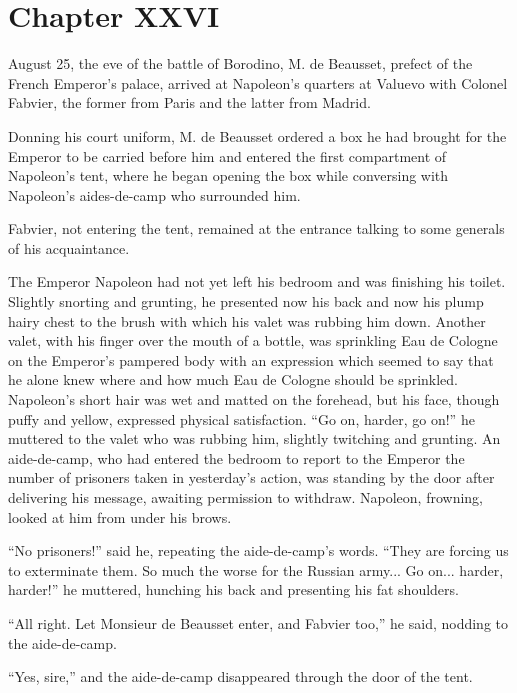 \chapter*{Chapter XXVI} \ifaudio {}
\fi

 August 25, the eve of the battle of Borodino, M. de Beausset,
prefect of the French Emperor's palace, arrived at Napoleon's
quarters at Valuevo with Colonel Fabvier, the former from Paris
and the latter from Madrid.

Donning his court uniform, M. de Beausset ordered a box he had
brought for the Emperor to be carried before him and entered the
first compartment of Napoleon's tent, where he began opening the
box while conversing with Napoleon's aides-de-camp who surrounded
him.

Fabvier, not entering the tent, remained at the entrance talking
to some generals of his acquaintance.

The Emperor Napoleon had not yet left his bedroom and was
finishing his toilet. Slightly snorting and grunting, he
presented now his back and now his plump hairy chest to the brush
with which his valet was rubbing him down. Another valet, with
his finger over the mouth of a bottle, was sprinkling Eau de
Cologne on the Emperor's pampered body with an expression which
seemed to say that he alone knew where and how much Eau de
Cologne should be sprinkled. Napoleon's short hair was wet and
matted on the forehead, but his face, though puffy and yellow,
expressed physical satisfaction. ``Go on, harder, go on!'' he
muttered to the valet who was rubbing him, slightly twitching and
grunting. An aide-de-camp, who had entered the bedroom to report
to the Emperor the number of prisoners taken in yesterday's
action, was standing by the door after delivering his message,
awaiting permission to withdraw. Napoleon, frowning, looked at
him from under his brows.

``No prisoners!'' said he, repeating the aide-de-camp's
words. ``They are forcing us to exterminate them. So much the
worse for the Russian army... Go on... harder, harder!'' he
muttered, hunching his back and presenting his fat shoulders.

``All right. Let Monsieur de Beausset enter, and Fabvier too,''
he said, nodding to the aide-de-camp.

``Yes, sire,'' and the aide-de-camp disappeared through the door
of the tent.

